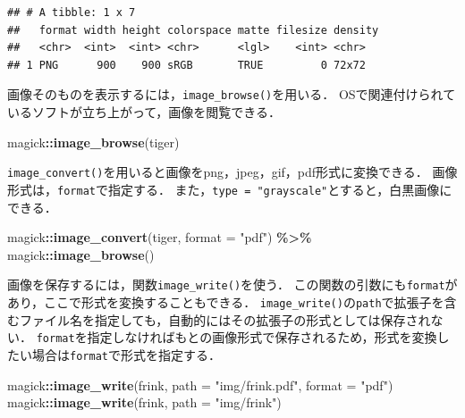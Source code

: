 \documentclass[
]{article}
\newenvironment{Shaded}{\begin{snugshade}}{\end{snugshade}}
\newcommand{\AttributeTok}[1]{\textcolor[rgb]{0.13,0.29,0.53}{#1}}
\newcommand{\FunctionTok}[1]{\textcolor[rgb]{0.13,0.29,0.53}{\textbf{#1}}}
\newcommand{\NormalTok}[1]{#1}
\newcommand{\SpecialCharTok}[1]{\textcolor[rgb]{0.81,0.36,0.00}{\textbf{#1}}}
\newcommand{\StringTok}[1]{\textcolor[rgb]{0.31,0.60,0.02}{#1}}
\begin{document}
\begin{verbatim}
## # A tibble: 1 x 7
##   format width height colorspace matte filesize density
##   <chr>  <int>  <int> <chr>      <lgl>    <int> <chr>  
## 1 PNG      900    900 sRGB       TRUE         0 72x72
\end{verbatim}

画像そのものを表示するには，\texttt{image\_browse()}を用いる．
OSで関連付けられているソフトが立ち上がって，画像を閲覧できる．

\begin{Shaded}
\begin{Highlighting}[]
\NormalTok{magick}\SpecialCharTok{::}\FunctionTok{image\_browse}\NormalTok{(tiger)}
\end{Highlighting}
\end{Shaded}

\texttt{image\_convert()}を用いると画像をpng，jpeg，gif，pdf形式に変換できる．
画像形式は，\texttt{format}で指定する．
また，\texttt{type\ =\ "grayscale"}とすると，白黒画像にできる．

\begin{Shaded}
\begin{Highlighting}[]
\NormalTok{magick}\SpecialCharTok{::}\FunctionTok{image\_convert}\NormalTok{(tiger, }\AttributeTok{format =} \StringTok{"pdf"}\NormalTok{) }\SpecialCharTok{\%\textgreater{}\%}
\NormalTok{  magick}\SpecialCharTok{::}\FunctionTok{image\_browse}\NormalTok{()}
\end{Highlighting}
\end{Shaded}

画像を保存するには，関数\texttt{image\_write()}を使う．
この関数の引数にも\texttt{format}があり，ここで形式を変換することもできる．
\texttt{image\_write()}の\texttt{path}で拡張子を含むファイル名を指定しても，自動的にはその拡張子の形式としては保存されない．
\texttt{format}を指定しなければもとの画像形式で保存されるため，形式を変換したい場合は\texttt{format}で形式を指定する．

\begin{Shaded}
\begin{Highlighting}[]
\NormalTok{magick}\SpecialCharTok{::}\FunctionTok{image\_write}\NormalTok{(frink, }\AttributeTok{path =} \StringTok{"img/frink.pdf"}\NormalTok{, }\AttributeTok{format =} \StringTok{"pdf"}\NormalTok{) }
\NormalTok{magick}\SpecialCharTok{::}\FunctionTok{image\_write}\NormalTok{(frink, }\AttributeTok{path =} \StringTok{"img/frink"}\NormalTok{)}
\end{Highlighting}
\end{Shaded}
\end{document}
